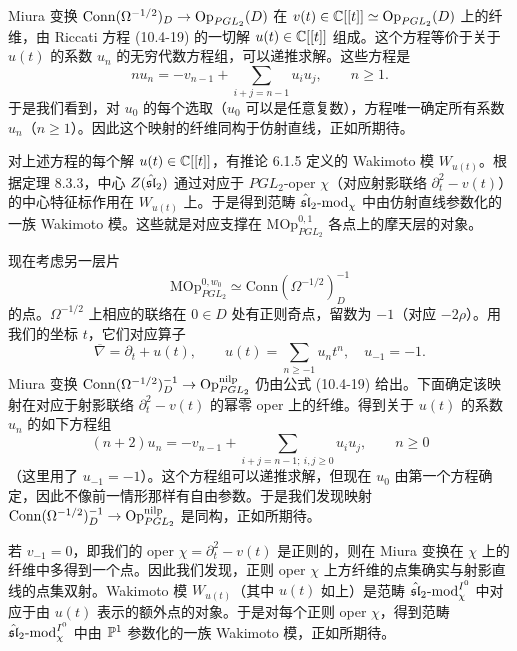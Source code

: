 Miura 变换 $\mathrm{Conn}(\Omega^{-1/2})_D\to\operatorname{Op}_{PGL_2}(D)$ 在 $v(t)\in\mathbb{C}[[t]]\simeq\operatorname{Op}_{PGL_2}(D)$ 上的纤维，由 Riccati 方程 (10.4-19) 的一切解 $u(t)\in\mathbb{C}[[t]]$ 组成。这个方程等价于关于 $u(t)$ 的系数 $u_n$ 的无穷代数方程组，可以递推求解。这些方程是
\[
    nu_n=-v_{n-1}+\sum_{i+j=n-1}u_iu_j,\qquad n\ge1.
\]
于是我们看到，对 $u_0$ 的每个选取（$u_0$ 可以是任意复数），方程唯一确定所有系数 $u_n$（$n\ge1$）。因此这个映射的纤维同构于仿射直线，正如所期待。

对上述方程的每个解 $u(t)\in\mathbb{C}[[t]]$，有推论 6.1.5 定义的 Wakimoto 模 $W_{u(t)}$。根据定理 8.3.3，中心 $Z(\hat{\mathfrak{sl}}_2)$ 通过对应于 $PGL_2$-oper $\chi$（对应射影联络 $\partial_t^2-v(t)$）的中心特征标作用在 $W_{u(t)}$ 上。于是得到范畴 $\hat{\mathfrak{sl}}_2\text{-}\mathrm{mod}_\chi$ 中由仿射直线参数化的一族 Wakimoto 模。这些就是对应支撑在 $\mathrm{MOp}^{0,1}_{PGL_2}$ 各点上的摩天层的对象。

现在考虑另一层片
\[
    \mathrm{MOp}^{0,w_0}_{PGL_2}
    \simeq\mathrm{Conn}(\Omega^{-1/2})^{-1}_D
\]
的点。$\Omega^{-1/2}$ 上相应的联络在 $0\in D$ 处有正则奇点，留数为 $-1$（对应 $-2\rho$）。用我们的坐标 $t$，它们对应算子
\[
    \overline{\nabla}=\partial_t+u(t),\qquad
    u(t)=\sum_{n\ge-1}u_nt^n,\quad u_{-1}=-1.
\]
Miura 变换 $\mathrm{Conn}(\Omega^{-1/2})^{-1}_D\to\operatorname{Op}^{\mathrm{nilp}}_{PGL_2}$ 仍由公式 (10.4-19) 给出。下面确定该映射在对应于射影联络 $\partial_t^2-v(t)$ 的幂零 oper 上的纤维。得到关于 $u(t)$ 的系数 $u_n$ 的如下方程组
\begin{equation}
    (n+2)u_n=-v_{n-1}
    +\sum_{i+j=n-1;\ i,j\ge0}u_iu_j,
    \qquad n\ge0
    \tag{10.4-20}
\end{equation}
（这里用了 $u_{-1}=-1$）。这个方程组可以递推求解，但现在 $u_0$ 由第一个方程确定，因此不像前一情形那样有自由参数。于是我们发现映射 $\mathrm{Conn}(\Omega^{-1/2})^{-1}_D\to\operatorname{Op}^{\mathrm{nilp}}_{PGL_2}$ 是同构，正如所期待。

若 $v_{-1}=0$，即我们的 oper $\chi=\partial_t^2-v(t)$ 是正则的，则在 Miura 变换在 $\chi$ 上的纤维中多得到一个点。因此我们发现，正则 oper $\chi$ 上方纤维的点集确实与射影直线的点集双射。Wakimoto 模 $W_{u(t)}$（其中 $u(t)$ 如上）是范畴 $\hat{\mathfrak{sl}}_2\text{-}\mathrm{mod}_\chi^{I^0}$ 中对应于由 $u(t)$ 表示的额外点的对象。于是对每个正则 oper $\chi$，得到范畴 $\hat{\mathfrak{sl}}_2\text{-}\mathrm{mod}_\chi^{I^0}$ 中由 $\mathbb{P}^1$ 参数化的一族 Wakimoto 模，正如所期待。

